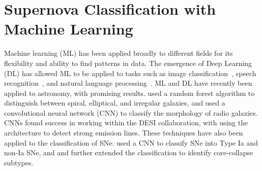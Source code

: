 \section{Supernova Classification with Machine Learning}
\label{sec:supernova-classification-with-machine-learning}
Machine learning (ML) has been applied broadly to different fields for its flexibility 
and ability to find patterns in data. The emergence of Deep Learning (DL) has
allowed ML to be applied to tasks such as image
classification~\parencite{krizhevsky2012}, speech recognition~\parencite{Nassif2019},
and natural language processing~\parencite{Mikolov2013}. ML and DL 
have recently been applied to astronomy, with promising results. \textcite{Gauci2010} used 
a random forest algorithm  to distinguish between spiral, elliptical, and irregular galaxies, 
and \textcite{Becker2021} used a convolutional neural network (CNN) to classify the morphology of
radio galaxies. CNNs found success in working within the DESI collaboration, with 
\textcite{parks2018} using the architecture to detect strong emission lines.  
These techniques have also been applied to the classification of SNe. 
\textcite{Mller2016} used a CNN to classify SNe into Type Ia and non-Ia SNe, and \textcite{Muthukrishna2019} and \textcite{Davison2022} further extended the classification to identify core-collapse subtypes.

